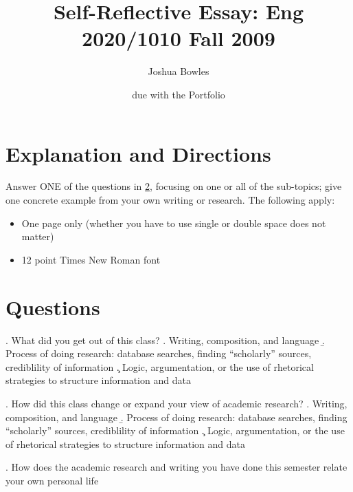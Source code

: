 \documentclass[11pt,twoside]{article}
\begin{document}
\author{Joshua Bowles}
\title{Self-Reflective Essay: Eng 2020/1010 Fall 2009}
\date{due with the Portfolio}


\maketitle
\section{Explanation and Directions}
Answer ONE of the questions in \ref{q}, focusing on one or all of the sub-topics; give one concrete example from your own writing or research. The following apply:

\begin{itemize}
\item One page only (whether you have to use single or double space does not matter)
\item 12 point Times New Roman font 
\end{itemize}

\section{Questions}\label{q}
\ex. What did you get out of this class?
\a. Writing, composition, and language
\b. Process of doing research: database searches, finding ``scholarly'' sources, crediblility of information 
\c. Logic, argumentation, or the use of rhetorical strategies to structure information and data

\ex. How did this class change or expand your view of academic research?
\a. Writing, composition, and language
\b. Process of doing research: database searches, finding ``scholarly'' sources, crediblility of information
\c. Logic, argumentation, or the use of rhetorical strategies to structure information and data

\ex. How does the academic research and writing you have done this semester relate your own personal life
\end{document}
